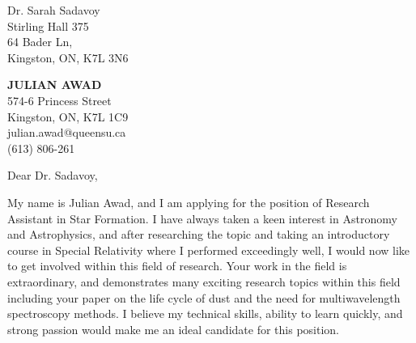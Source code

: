 \documentclass[11pt]{letter} %
\begin{document}
\begin{letter}{Dr. Sarah Sadavoy \\
Stirling Hall 375 \\
64 Bader Ln, \\
Kingston, ON, K7L 3N6}

\begin{center}
\textbf{\huge JULIAN AWAD} \\ %
\vspace{1em} %
574-6 Princess Street \\ Kingston, ON, K7L 1C9 \\ julian.awad@queensu.ca \\ (613) 806-261 %
\end{center}
\hspace{2em}
\signature{Julian Awad} %
\vspace{-0.3in}
\opening{Dear Dr. Sadavoy,}

My name is Julian Awad, and I am applying for the position of Research Assistant in Star Formation. I have always taken a keen interest in Astronomy and Astrophysics, and after researching the topic and taking an introductory course in Special Relativity where I performed exceedingly well, I would now like to get involved within this field of research. Your work in the field is extraordinary, and demonstrates many exciting research topics within this field including your paper on the life cycle of dust and the need for multiwavelength spectroscopy methods. I believe my technical skills, ability to learn quickly, and strong passion would make me an ideal candidate for this position.


\end{letter}
\end{document}
